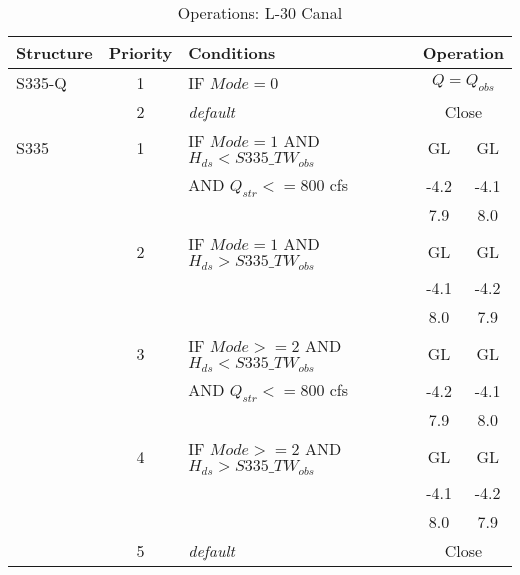 \scriptsize
\begin{table}[!h]
\centering
\caption{Operations: L-30 Canal}
\label{tab:M11opsL30}
\begin{tabular}{|l|c|l|c|c|}
\hline
\textbf{Structure} & \textbf{Priority}  & \textbf{Conditions} & \multicolumn{2}{|c|}{\textbf{Operation}}   \\
\hline
\hline
S335-Q        &  1  & IF $Mode=0$                   & \multicolumn{2}{|c|}{$Q = Q_{obs}$}   \\
\hline
              &  2  & \it{default}                  & \multicolumn{2}{|c|}{Close}           \\
\hline
\hline
S335          &  1  & IF $Mode=1$ AND $H_{ds}<S335\_TW_{obs}$                   & GL    & GL   \\
              &     &  AND $Q_{str}<=800$ cfs       & -4.2  & -4.1 \\
              &     &        & 7.9   & 8.0  \\
\hline
              &  2  & IF $Mode=1$ AND $H_{ds}>S335\_TW_{obs}$                   & GL    & GL   \\
              &     &   & -4.1 & -4.2  \\
              &     &                               & 8.0  & 7.9   \\
\hline
              &  3  & IF $Mode>=2$ AND $H_{ds}<S335\_TW_{obs}$                 & GL    & GL   \\
              &     & AND $Q_{str}<=800$ cfs   & -4.2  & -4.1 \\
              &     &          & 7.9   & 8.0  \\
\hline
              &  4  & IF $Mode>=2$ AND $H_{ds}>S335\_TW_{obs}$                  & GL    & GL   \\
              &     &   & -4.1 & -4.2  \\
              &     &                               & 8.0  & 7.9   \\
\hline
              &  5  & \it{default}                  & \multicolumn{2}{|c|}{Close}   \\

\hline
\hline
\end{tabular}
\end{table}
\normalsize

